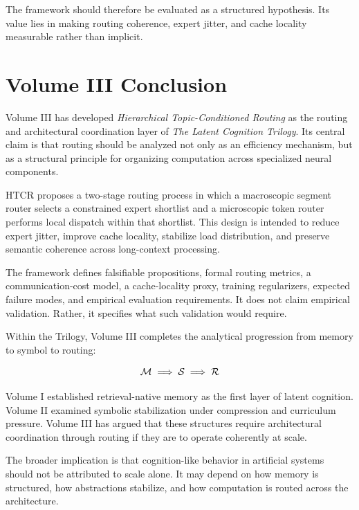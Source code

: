 The framework should therefore be evaluated as a structured hypothesis. Its value lies in making routing coherence, expert jitter, and cache locality measurable rather than implicit.

\chapter{Volume III Conclusion}

Volume III has developed \textit{Hierarchical Topic-Conditioned Routing} as the routing and architectural coordination layer of \textit{The Latent Cognition Trilogy}. Its central claim is that routing should be analyzed not only as an efficiency mechanism, but as a structural principle for organizing computation across specialized neural components.

HTCR proposes a two-stage routing process in which a macroscopic segment router selects a constrained expert shortlist and a microscopic token router performs local dispatch within that shortlist. This design is intended to reduce expert jitter, improve cache locality, stabilize load distribution, and preserve semantic coherence across long-context processing.

The framework defines falsifiable propositions, formal routing metrics, a communication-cost model, a cache-locality proxy, training regularizers, expected failure modes, and empirical evaluation requirements. It does not claim empirical validation. Rather, it specifies what such validation would require.

Within the Trilogy, Volume III completes the analytical progression from memory to symbol to routing:

\[
\mathcal{M} \;\Longrightarrow\; \mathcal{S} \;\Longrightarrow\; \mathcal{R}
\]

Volume I established retrieval-native memory as the first layer of latent cognition. Volume II examined symbolic stabilization under compression and curriculum pressure. Volume III has argued that these structures require architectural coordination through routing if they are to operate coherently at scale.

The broader implication is that cognition-like behavior in artificial systems should not be attributed to scale alone. It may depend on how memory is structured, how abstractions stabilize, and how computation is routed across the architecture.

% 
% 
